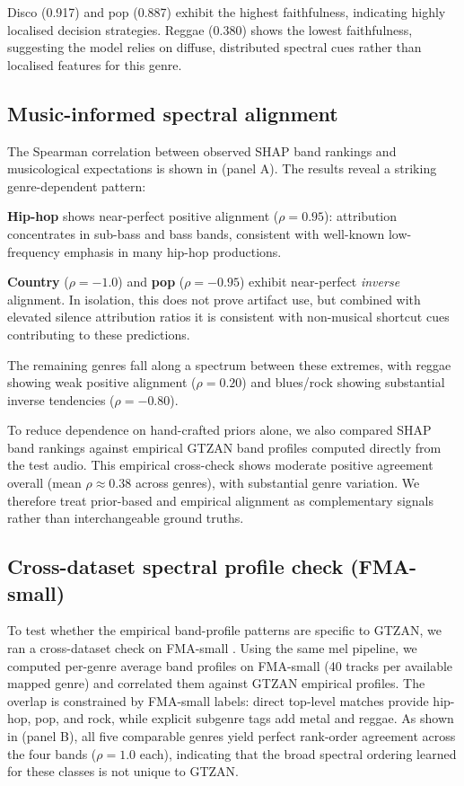 \documentclass{article}
\begin{document}
Disco (0.917) and pop (0.887) exhibit the highest faithfulness, indicating highly localised decision strategies. Reggae (0.380) shows the lowest faithfulness, suggesting the model relies on diffuse, distributed spectral cues rather than localised features for this genre.

\subsection{Music-informed spectral alignment}\label{subsec:alignment}

The Spearman correlation between observed SHAP band rankings and musicological expectations is shown in  (panel A). The results reveal a striking genre-dependent pattern:

\textbf{Hip-hop} shows near-perfect positive alignment ($\rho = 0.95$): attribution concentrates in sub-bass and bass bands, consistent with well-known low-frequency emphasis in many hip-hop productions.

\textbf{Country} ($\rho = -1.0$) and \textbf{pop} ($\rho = -0.95$) exhibit near-perfect \textit{inverse} alignment. In isolation, this does not prove artifact use, but combined with elevated silence attribution ratios it is consistent with non-musical shortcut cues contributing to these predictions.

The remaining genres fall along a spectrum between these extremes, with reggae showing weak positive alignment ($\rho = 0.20$) and blues/rock showing substantial inverse tendencies ($\rho = -0.80$).

To reduce dependence on hand-crafted priors alone, we also compared SHAP band rankings against empirical GTZAN band profiles computed directly from the test audio. This empirical cross-check shows moderate positive agreement overall (mean $\rho \approx 0.38$ across genres), with substantial genre variation. We therefore treat prior-based and empirical alignment as complementary signals rather than interchangeable ground truths.

\subsection{Cross-dataset spectral profile check (FMA-small)}\label{subsec:fma_check}

To test whether the empirical band-profile patterns are specific to GTZAN, we ran a cross-dataset check on FMA-small \cite{Defferrard2017}. Using the same mel pipeline, we computed per-genre average band profiles on FMA-small (40 tracks per available mapped genre) and correlated them against GTZAN empirical profiles. The overlap is constrained by FMA-small labels: direct top-level matches provide hip-hop, pop, and rock, while explicit subgenre tags add metal and reggae. As shown in  (panel B), all five comparable genres yield perfect rank-order agreement across the four bands ($\rho=1.0$ each), indicating that the broad spectral ordering learned for these classes is not unique to GTZAN.
\end{document}

